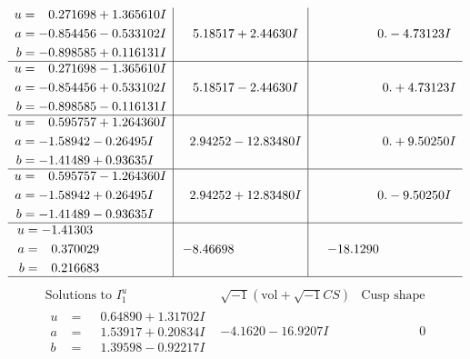 \documentclass[1p]{elsarticle_modified}
\theoremstyle{definition}
\newcommand{\I}{\sqrt{-1}}
\begin{document}
$$\begin{array}{c|c|c}
\begin{aligned}
u &= \phantom{-}0.271698 + 1.365610 I \\
a &= -0.854456 - 0.533102 I \\
b &= -0.898585 + 0.116131 I\end{aligned}
 & \phantom{-}5.18517 + 2.44630 I & \phantom{-0.000000 } 0. - 4.73123 I \\ \hline\begin{aligned}
u &= \phantom{-}0.271698 - 1.365610 I \\
a &= -0.854456 + 0.533102 I \\
b &= -0.898585 - 0.116131 I\end{aligned}
 & \phantom{-}5.18517 - 2.44630 I & \phantom{-0.000000 -}0. + 4.73123 I \\ \hline\begin{aligned}
u &= \phantom{-}0.595757 + 1.264360 I \\
a &= -1.58942 - 0.26495 I \\
b &= -1.41489 + 0.93635 I\end{aligned}
 & \phantom{-}2.94252 - 12.83480 I & \phantom{-0.000000 -}0. + 9.50250 I \\ \hline\begin{aligned}
u &= \phantom{-}0.595757 - 1.264360 I \\
a &= -1.58942 + 0.26495 I \\
b &= -1.41489 - 0.93635 I\end{aligned}
 & \phantom{-}2.94252 + 12.83480 I & \phantom{-0.000000 } 0. - 9.50250 I \\ \hline\begin{aligned}
u &= -1.41303\phantom{ +0.000000I} \\
a &= \phantom{-}0.370029\phantom{ +0.000000I} \\
b &= \phantom{-}0.216683\phantom{ +0.000000I}\end{aligned}
 & -8.46698\phantom{ +0.000000I} & -18.1290\phantom{ +0.000000I}\\
 \hline 
 \end{array}$$\newpage$$\begin{array}{c|c|c}  
\text{Solutions to }I^u_{1}& \I (\text{vol} + \sqrt{-1}CS) & \text{Cusp shape}\\
 \hline 
\begin{aligned}
u &= \phantom{-}0.64890 + 1.31702 I \\
a &= \phantom{-}1.53917 + 0.20834 I \\
b &= \phantom{-}1.39598 - 0.92217 I\end{aligned}
 & -4.1620 - 16.9207 I & \phantom{-0.000000 } 0 \\ \hline\begin{aligned}

\end{aligned}
\end{array}$$
\end{document}
